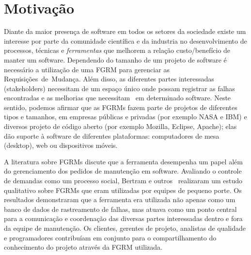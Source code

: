 \section{Motivação}
\label{sec:intro-motivacao}

Diante da maior presença de software em todos os setores da sociedade existe um
interesse por parte da comunidade científica e da industria no desenvolvimento
de processos, técnicas e \textit{ferramentas} que melhorem a relação
custo/benefício de manter um software. Dependendo do tamanho de um projeto de
software é necessário a utilização de uma FGRM para gerenciar as
Requisições~de~Mudança. Além disso, as diferentes partes interessadas
(stakeholders) necessitam de um espaço único onde possam registrar as falhas
encontradas e as melhorias que necessitam~\cite{1407819} em determinado
software. Neste sentido, podemos afirmar que as FGRMs fazem parte de projetos de
diferentes tipos e tamanhos, em empresas públicas e privadas (por exemplo NASA e
IBM) e diversos projeto de código aberto (por exemplo Mozilla, Eclipse, Apache);
elas dão suporte à software de diferentes plataformas: computadores de mesa
(desktop), web ou dispositivos móveis.


A literatura sobre FGRMs discute que a ferramenta desempenha um papel além do
gerenciamento dos pedidos de manutenção em software. Avaliando o controle de
demandas como um processo social, Bertram e
outros~\cite{Bertram:2010:CCB:1718918.1718972} realizaram um estudo qualitativo
sobre FGRMs que eram utilizadas por equipes de pequeno porte. Os resultados
demonstraram que a ferramenta era utilizada não apenas como um banco de dados de
rastreamento de falhas, mas atuava como um ponto central para a comunicação e
coordenação das diversas partes interessadas dentro e fora da equipe de
manutenção. Os clientes, gerentes de projeto, analistas de qualidade e
programadores contribuíam em conjunto para o compartilhamento do conhecimento do
projeto através da FGRM utilizada.

